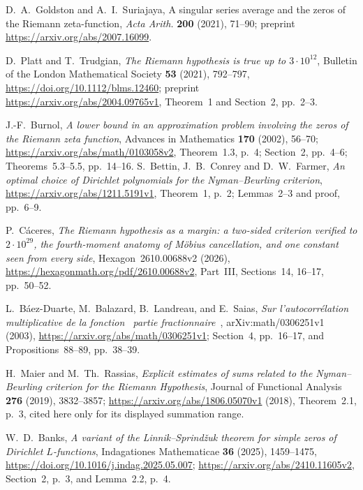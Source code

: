 D.~A.~Goldston and A.~I.~Suriajaya, A singular series average and the
zeros of the Riemann zeta-function, \emph{Acta Arith.}
\textbf{200} (2021), 71--90; preprint
\url{https://arxiv.org/abs/2007.16099}.

 D.~Platt and T.~Trudgian, \emph{The Riemann hypothesis is true up to $3\cdot10^{12}$}, Bulletin of the London Mathematical Society \textbf{53} (2021), 792--797, \url{https://doi.org/10.1112/blms.12460}; preprint \url{https://arxiv.org/abs/2004.09765v1}, Theorem~1 and Section~2, pp.~2--3.

 J.-F.~Burnol, \emph{A lower bound in an approximation problem involving the zeros of the Riemann zeta function}, Advances in Mathematics \textbf{170} (2002), 56--70; \url{https://arxiv.org/abs/math/0103058v2}, Theorem~1.3, p.~4; Section~2, pp.~4--6; Theorems~5.3--5.5, pp.~14--16.
 S.~Bettin, J.~B.~Conrey and D.~W.~Farmer, \emph{An optimal choice of Dirichlet polynomials for the Nyman--Beurling criterion}, \url{https://arxiv.org/abs/1211.5191v1}, Theorem~1, p.~2; Lemmas~2--3 and proof, pp.~6--9.

 P.~C\'aceres, \emph{The Riemann hypothesis as a margin: a two-sided criterion verified to $2\cdot10^{29}$, the fourth-moment anatomy of M\"obius cancellation, and one constant seen from every side}, Hexagon~2610.00688v2 (2026), \url{https://hexagonmath.org/pdf/2610.00688v2}, Part~III, Sections~14, 16--17, pp.~50--52.

L.~B\'aez-Duarte, M.~Balazard, B.~Landreau, and E.~Saias,
\emph{Sur l'autocorr\'elation multiplicative de la fonction
\guillemotleft\ partie fractionnaire\ \guillemotright},
arXiv:math/0306251v1 (2003),
\url{https://arxiv.org/abs/math/0306251v1};
Section~4, pp.~16--17, and Propositions~88--89, pp.~38--39.

H.~Maier and M.~Th.~Rassias,
\emph{Explicit estimates of sums related to the Nyman--Beurling
criterion for the Riemann Hypothesis},
Journal of Functional Analysis \textbf{276} (2019), 3832--3857;
\url{https://arxiv.org/abs/1806.05070v1} (2018),
Theorem~2.1, p.~3, cited here only for its displayed summation range.

W.~D.~Banks, \emph{A variant of the Linnik--Sprind\v zuk theorem
for simple zeros of Dirichlet $L$-functions},
Indagationes Mathematicae \textbf{36} (2025), 1459--1475,
\url{https://doi.org/10.1016/j.indag.2025.05.007};
\url{https://arxiv.org/abs/2410.11605v2},
Section~2, p.~3, and Lemma~2.2, p.~4.

